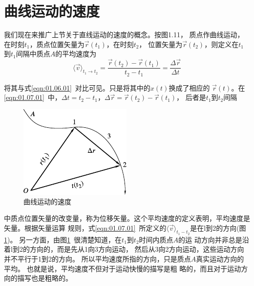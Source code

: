 \section{曲线运动的速度}\label{sec:01.07}

我们现在来推广上节关于直线运动的速度的概念。按图1.11，
质点作曲线运动，在时刻$t_1$，质点位置矢量为$\vec{r}\left(t_1\right)$，在时刻$t_2$，
位置矢量为$\vec{r}\left(t_2\right)$，则定义在$t_1$到$t_1$间隔中质点$ A $的平均速度为
\begin{equation}\label{eqn:01.07.01}
  \langle \vec{v} \rangle_{t_1\rightarrow t_2}=\frac{\vec{r}\left(t_2\right)-\vec{r}\left(t_1\right)}{t_2-t_1}=\frac{\Delta \vec{r}}{\Delta t}
\end{equation}

\clearpage\noindent 将其与式\eqref{eqn:01.06.01}~对比可见。只是将其中的$x\left(t\right)$换成了相应的
$\vec{r}\left(t\right)$。在\eqref{eqn:01.07.01}~中，$\Delta t=t_2-t_1$，$\Delta \vec{r}=\vec{r}\left(t_2\right)-\vec{r}\left(t_1\right)$，
后者是$t_1$到$t_2$间隔
\begin{figure}
  \centering
  \small
  \includegraphics{figure/fig01.11}
  \caption{曲线运动的速度}
  \label{fig:01.11}
\end{figure}
中质点位置矢量的改变量，称为位移矢量。这个平均速度的定义表明，平均速度是矢量。根据矢量运算
规则，式\eqref{eqn:01.07.01}~所定义的$\langle \vec{v}\rangle_{t_1-t_2}$是在l到2的方向(图\ref{fig:01.11})。
另一方面，由图\ref{fig:01.11}~很清楚知道，在$t_1$到$t_2$时间内质点$A$的运
动方向并非总是沿着l到2的方向的，而是先从1向3方向运动，
然后从3向2方向运动，这些运动方向并不平行于1到2的方向。
所以平均速度所指的方向，只是质点$A$真实运动方向的平均。
也就是说，平均速度不但对于运动快慢的描写是粗
略的，而且对于运动方向的描写也是粗略的。

